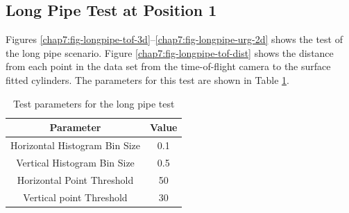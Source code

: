 \subsection{Long Pipe Test at Position 1}
Figures \ref{chap7:fig-longpipe-tof-3d}--\ref{chap7:fig-longpipe-urg-2d} shows the test of
the long pipe scenario. Figure \ref{chap7:fig-longpipe-tof-dist} shows the distance from each
point in the data set from the time-of-flight camera to the surface fitted cylinders. The
parameters for this test are shown in Table \ref{chap7:tab-longpipe}.
\begin{table}[htbp]
    \centering
    \begin{tabular}{|c|c|}
        \hline
        Parameter   &   Value   \\
        \hline
        Horizontal Histogram Bin Size & 0.1 \\
        Vertical Histogram Bin Size & 0.5 \\
        Horizontal Point Threshold & 50 \\
        Vertical point Threshold & 30 \\
        \hline
    \end{tabular}
    \caption{Test parameters for the long pipe test}
    \label{chap7:tab-longpipe}
\end{table}

